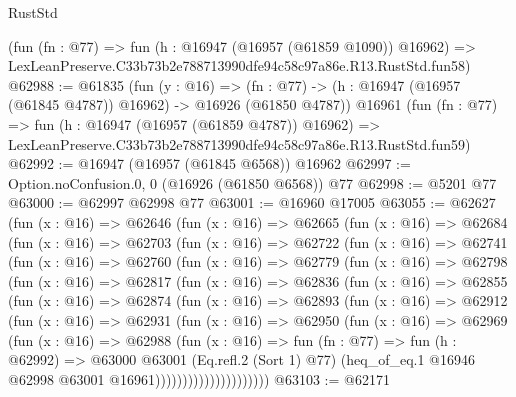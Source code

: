 \begin{lexlean}{RustStd}
\begin{coremodule}
    (fun (fn : @77) =>
    fun (h : @16947 (@16957 (@61859 @1090)) @16962) =>
    LexLeanPreserve.C33b73b2e788713990dfe94c58c97a86e.R13.RustStd.fun58)
@62988 := @61835
    (fun (y : @16) =>
    (fn : @77) -> (h : @16947 (@16957 (@61845 @4787)) @16962) -> @16926 (@61850 @4787))
    @16961
    (fun (fn : @77) =>
    fun (h : @16947 (@16957 (@61859 @4787)) @16962) =>
    LexLeanPreserve.C33b73b2e788713990dfe94c58c97a86e.R13.RustStd.fun59)
@62992 := @16947 (@16957 (@61845 @6568)) @16962
@62997 := Option.noConfusion.{0, 0} (@16926 (@61850 @6568)) @77
@62998 := @5201 @77
@63000 := @62997 @62998 @77
@63001 := @16960 @17005
@63055 := @62627
    (fun (x : @16) =>
    @62646
      (fun (x : @16) =>
      @62665
        (fun (x : @16) =>
        @62684
          (fun (x : @16) =>
          @62703
            (fun (x : @16) =>
            @62722
              (fun (x : @16) =>
              @62741
                (fun (x : @16) =>
                @62760
                  (fun (x : @16) =>
                  @62779
                    (fun (x : @16) =>
                    @62798
                      (fun (x : @16) =>
                      @62817
                        (fun (x : @16) =>
                        @62836
                          (fun (x : @16) =>
                          @62855
                            (fun (x : @16) =>
                            @62874
                              (fun (x : @16) =>
                              @62893
                                (fun (x : @16) =>
                                @62912
                                  (fun (x : @16) =>
                                  @62931
                                    (fun (x : @16) =>
                                    @62950
                                      (fun (x : @16) =>
                                      @62969
                                        (fun (x : @16) =>
                                        @62988
                                          (fun (x : @16) =>
                                          fun (fn : @77) =>
                                          fun (h : @62992) =>
                                          @63000
                                            @63001
                                            (Eq.refl.{2} (Sort 1) @77)
                                            (heq_of_eq.{1}
                                              @16946
                                              @62998
                                              @63001
                                              @16961)))))))))))))))))))))
@63103 := @62171

\end{coremodule}
\end{lexlean}
